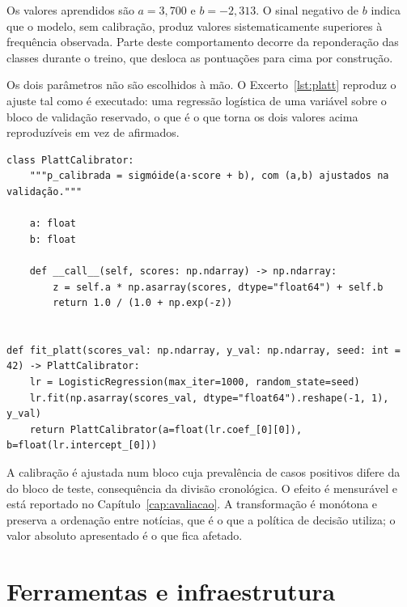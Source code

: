 Os valores aprendidos são $a = 3{,}700$ e $b = -2{,}313$. O sinal negativo de $b$ indica que o
modelo, sem calibração, produz valores sistematicamente superiores à frequência observada. Parte
deste comportamento decorre da reponderação das classes durante o treino, que desloca as pontuações
para cima por construção.

Os dois parâmetros não são escolhidos à mão. O Excerto~\ref{lst:platt} reproduz o ajuste tal como é executado: uma regressão logística de uma variável sobre o bloco de validação reservado, o que é o que torna os dois valores acima reproduzíveis em vez de afirmados.

\begin{lstlisting}[caption={[Onde uma pontuação passa a ser uma probabilidade]Onde uma pontuação passa a ser uma probabilidade. Os dois parâmetros não são escolhidos: são ajustados por uma regressão logística sobre o bloco de validação reservado, o que é o que torna o valor da Equação~\ref{eq:platt} reproduzível. A classe e a função de ajuste são reproduzidas do ficheiro de origem.}, label={lst:platt}, float=htbp]
class PlattCalibrator:
    """p_calibrada = sigmóide(a·score + b), com (a,b) ajustados na validação."""

    a: float
    b: float

    def __call__(self, scores: np.ndarray) -> np.ndarray:
        z = self.a * np.asarray(scores, dtype="float64") + self.b
        return 1.0 / (1.0 + np.exp(-z))


def fit_platt(scores_val: np.ndarray, y_val: np.ndarray, seed: int = 42) -> PlattCalibrator:
    lr = LogisticRegression(max_iter=1000, random_state=seed)
    lr.fit(np.asarray(scores_val, dtype="float64").reshape(-1, 1), y_val)
    return PlattCalibrator(a=float(lr.coef_[0][0]), b=float(lr.intercept_[0]))
\end{lstlisting}

A calibração é ajustada num bloco cuja prevalência de casos positivos difere da do bloco de teste,
consequência da divisão cronológica. O efeito é mensurável e está reportado no
Capítulo~\ref{cap:avaliacao}. A transformação é monótona e preserva a ordenação entre notícias, que
é o que a política de decisão utiliza; o valor absoluto apresentado é o que fica afetado.

\section{Ferramentas e infraestrutura}
\label{sec:met_ferramentas}

